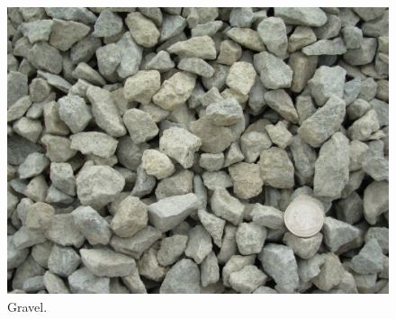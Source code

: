 \begin{figure}[!htb]
\centering
\includegraphics[width=.50\columnwidth]{images/054bsgmaterials}
\caption[Gravel]{Gravel.}
\label{fig:054bsgmaterials}
\end{figure}